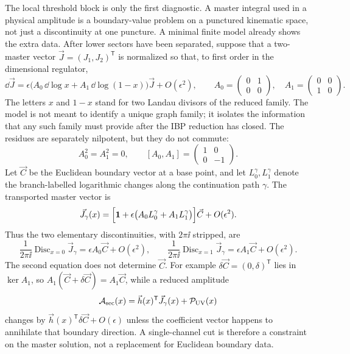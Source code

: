 \begin{controlledapproximation}
\label{ca:two-letter-master-transport}
The local threshold block is only the first diagnostic.  A master integral used
in a physical amplitude is a boundary-value problem on a punctured kinematic
space, not just a discontinuity at one puncture.  A minimal finite model already
shows the extra data.  After lower sectors have been separated, suppose that a
two-master vector \(\vec J=(J_1,J_2)^{\mathsf T}\) is normalized so that, to
first order in the dimensional regulator,
\begin{equation}
  \dd\vec J
  =
  \epsilon\bigl(A_0\,\dd\log x+A_1\,\dd\log(1-x)\bigr)\vec J
  +O(\epsilon^2),
  \qquad
  A_0=
  \begin{pmatrix}
    0&1\\
    0&0
  \end{pmatrix},
  \quad
  A_1=
  \begin{pmatrix}
    0&0\\
    1&0
  \end{pmatrix}.
  \label{eq:two-letter-master-transport-system}
\end{equation}
The letters \(x\) and \(1-x\) stand for two Landau divisors of the reduced
family.  The model is not meant to identify a unique graph family; it isolates
the information that any such family must provide after the IBP reduction has
closed.  The residues are separately nilpotent, but they do not commute:
\[
  A_0^2=A_1^2=0,
  \qquad
  [A_0,A_1]=
  \begin{pmatrix}
    1&0\\
    0&-1
  \end{pmatrix}.
\]
Let \(\vec C\) be the Euclidean boundary vector at a base point, and let
\(L_0^\gamma,L_1^\gamma\) denote the branch-labelled logarithmic changes along
the continuation path \(\gamma\).  The transported master vector is
\begin{equation}
  \vec J_\gamma(x)
  =
  \Bigl[
    \mathbf 1+\epsilon\bigl(A_0L_0^\gamma+A_1L_1^\gamma\bigr)
  \Bigr]\vec C
  +O(\epsilon^2).
  \label{eq:two-letter-master-first-order-solution}
\end{equation}
Thus the two elementary discontinuities, with \(2\pi\ii\) stripped, are
\begin{equation}
  \frac{1}{2\pi\ii}\operatorname{Disc}_{x=0}\vec J_\gamma
  =
  \epsilon A_0\vec C+O(\epsilon^2),
  \qquad
  \frac{1}{2\pi\ii}\operatorname{Disc}_{x=1}\vec J_\gamma
  =
  \epsilon A_1\vec C+O(\epsilon^2).
  \label{eq:two-letter-master-stripped-discontinuities}
\end{equation}
The second equation does not determine \(\vec C\).  For example
\(\delta\vec C=(0,\delta)^{\mathsf T}\) lies in \(\ker A_1\), so
\(A_1(\vec C+\delta\vec C)=A_1\vec C\), while a reduced amplitude
\[
  \mathcal A_{\rm sec}(x)
  =
  \vec h(x)^{\mathsf T}\vec J_\gamma(x)+\mathcal P_{\rm UV}(x)
\]
changes by \(\vec h(x)^{\mathsf T}\delta\vec C+O(\epsilon)\) unless the
coefficient vector happens to annihilate that boundary direction.  A
single-channel cut is therefore a constraint on the master solution, not a
replacement for Euclidean boundary data.


\end{controlledapproximation}
